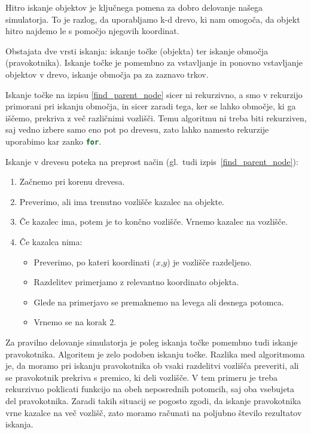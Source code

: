 \documentclass[a4paper,12pt]{article}
\begin{document}
Hitro iskanje objektov je ključnega pomena za dobro delovanje našega simulatorja.
To je razlog, da uporabljamo k-d drevo, ki nam omogoča, da objekt hitro najdemo le s
pomočjo njegovih koordinat.

Obstajata dve vrsti iskanja:
iskanje točke (objekta) ter iskanje območja (pravokotnika). Iskanje točke je pomembno za
vstavljanje in ponovno vstavljanje objektov v drevo, iskanje območja pa za zaznavo trkov.


Iskanje točke na izpisu \ref{find_parent_node} sicer ni rekurzivno, a smo v rekurzijo primorani
pri iskanju območja, in sicer zaradi tega, ker se lahko območje, ki ga iščemo, prekriva z več različnimi vozlišči.
Temu algoritmu ni treba biti rekurziven, saj vedno izbere samo eno pot po drevesu, zato lahko namesto
rekurzije uporabimo kar zanko \lstinline[language=C]{for}.

\begin{samepage}
Iskanje v drevesu poteka na preprost način (gl.\ tudi izpis~\ref{find_parent_node}):
    \begin{enumerate}
        \item Začnemo pri korenu drevesa.
        \item Preverimo, ali ima trenutno vozlišče kazalec na objekte.
        \item Če kazalec ima, potem je to končno vozlišče. Vrnemo kazalec na vozlišče.
        \item Če kazalca nima:
        \begin{itemize}
            \item Preverimo, po kateri koordinati ($x$,$y$) je vozlišče razdeljeno.
            \item Razdelitev primerjamo z relevantno koordinato objekta.
            \item Glede na primerjavo se premaknemo na levega ali desnega potomca.
            \item Vrnemo se na korak 2.
        \end{itemize}    
    \end{enumerate}
\end{samepage}

Za pravilno delovanje simulatorja je poleg iskanja točke pomembno tudi iskanje pravokotnika. Algoritem je zelo podoben
iskanju točke. Razlika med algoritmoma je, da moramo pri iskanju pravokotnika
ob vsaki razdelitvi vozlišča preveriti, ali se pravokotnik prekriva s premico, ki deli vozlišče. V tem
primeru je treba rekurzivno poklicati funkcijo na obeh neposrednih potomcih, saj oba vsebujeta del pravokotnika. Zaradi takih
situacij se pogosto zgodi, da iskanje pravokotnika vrne kazalce na več vozlišč, zato moramo računati na poljubno število
rezultatov iskanja.
\end{document}
